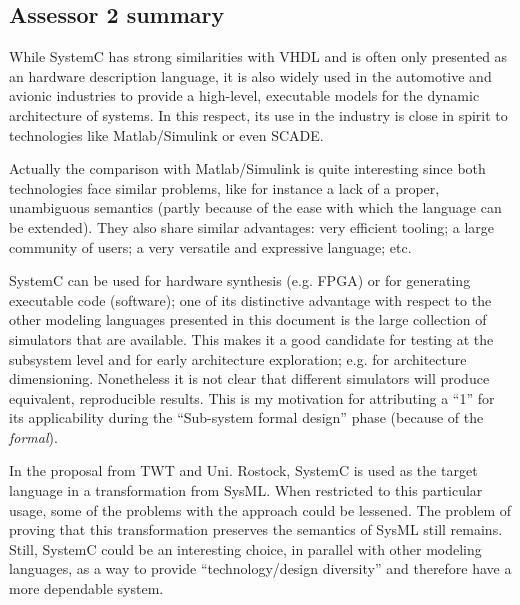 \subsection{Assessor 2 summary}
\label{sec:assessor-2-summary}

While SystemC has strong similarities with VHDL and is often only
presented as an hardware description language, it is also widely used
in the automotive and avionic industries to provide a high-level,
executable models for the dynamic architecture of systems. In this
respect, its use in the industry is close in spirit to technologies
like Matlab/Simulink or even SCADE.

Actually the comparison with Matlab/Simulink is quite interesting
since both technologies face similar problems, like for instance a
lack of a proper, unambiguous semantics (partly because of the ease
with which the language can be extended). They also share similar
advantages: very efficient tooling; a large community of users; a very
versatile and expressive language; etc.

SystemC can be used for hardware synthesis (e.g. FPGA) or for
generating executable code (software); one of its distinctive
advantage with respect to the other modeling languages presented in
this document is the large collection of simulators that are
available. This makes it a good candidate for testing at the subsystem
level and for early architecture exploration; e.g. for architecture
dimensioning. Nonetheless it is not clear that different simulators
will produce equivalent, reproducible results. This is my motivation
for attributing a ``1'' for its applicability during the ``Sub-system
formal design'' phase (because of the \emph{formal}).

In the proposal from TWT and Uni. Rostock, SystemC is used as the
target language in a transformation from SysML. When restricted to
this particular usage, some of the problems with the approach could be
lessened. The problem of proving that this transformation preserves
the semantics of SysML still remains. Still, SystemC could be an
interesting choice, in parallel with other modeling languages, as a
way to provide ``technology/design diversity'' and therefore have a
more dependable system.

